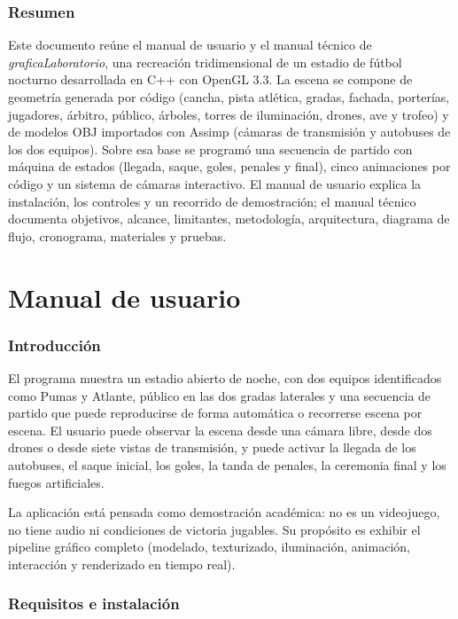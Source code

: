 \documentclass[12pt,letterpaper]{article}
\begin{document}
\section*{Resumen}
Este documento reúne el manual de usuario y el manual técnico de \emph{graficaLaboratorio}, una
recreación tridimensional de un estadio de fútbol nocturno desarrollada en C++ con OpenGL 3.3.
La escena se compone de geometría generada por código (cancha, pista atlética, gradas, fachada,
porterías, jugadores, árbitro, público, árboles, torres de iluminación, drones, ave y trofeo) y de
modelos OBJ importados con Assimp (cámaras de transmisión y autobuses de los dos equipos). Sobre
esa base se programó una secuencia de partido con máquina de estados (llegada, saque, goles,
penales y final), cinco animaciones por código y un sistema de cámaras interactivo. El manual de
usuario explica la instalación, los controles y un recorrido de demostración; el manual técnico
documenta objetivos, alcance, limitantes, metodología, arquitectura, diagrama de flujo, cronograma,
materiales y pruebas.

\part{Manual de usuario}

\section{Introducción}
El programa muestra un estadio abierto de noche, con dos equipos identificados como Pumas y
Atlante, público en las dos gradas laterales y una secuencia de partido que puede reproducirse de
forma automática o recorrerse escena por escena. El usuario puede observar la escena desde una
cámara libre, desde dos drones o desde siete vistas de transmisión, y puede activar la llegada de
los autobuses, el saque inicial, los goles, la tanda de penales, la ceremonia final y los fuegos
artificiales.

La aplicación está pensada como demostración académica: no es un videojuego, no tiene audio ni
condiciones de victoria jugables. Su propósito es exhibir el pipeline gráfico completo
(modelado, texturizado, iluminación, animación, interacción y renderizado en tiempo real).

\section{Requisitos e instalación}
\end{document}
